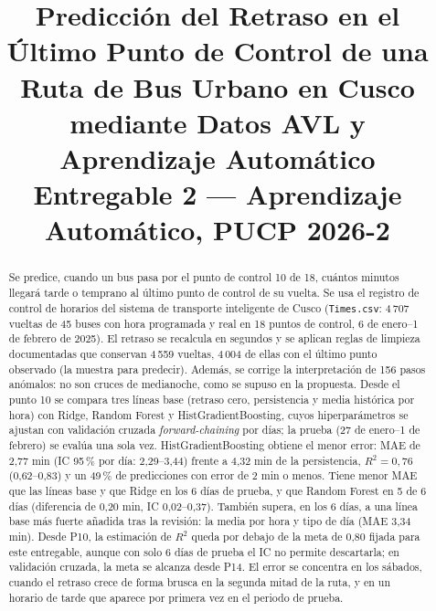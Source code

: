 \documentclass[conference,spanish]{IEEEtran}
\begin{document}
\title{Predicción del Retraso en el Último Punto de Control de una Ruta de Bus Urbano en Cusco mediante Datos AVL y Aprendizaje Automático\\
\large Entregable 2 --- Aprendizaje Automático, PUCP 2026-2}

\author{
}

\maketitle

\begin{abstract}
Se predice, cuando un bus pasa por el punto de control 10 de 18, cuántos minutos llegará tarde o temprano al último punto de control de su vuelta. Se usa el registro de control de horarios del sistema de transporte inteligente de Cusco (\texttt{Times.csv}: 4\,707 vueltas de 45 buses con hora programada y real en 18 puntos de control, 6 de enero--1 de febrero de 2025). El retraso se recalcula en segundos y se aplican reglas de limpieza documentadas que conservan 4\,559 vueltas, 4\,004 de ellas con el último punto observado (la muestra para predecir). Además, se corrige la interpretación de 156 pasos anómalos: no son cruces de medianoche, como se supuso en la propuesta. Desde el punto 10 se compara tres líneas base (retraso cero, persistencia y media histórica por hora) con Ridge, Random Forest y HistGradientBoosting, cuyos hiperparámetros se ajustan con validación cruzada \textit{forward-chaining} por días; la prueba (27 de enero--1 de febrero) se evalúa una sola vez. HistGradientBoosting obtiene el menor error: MAE de 2,77 min (IC 95\,\% por día: 2,29--3,44) frente a 4,32 min de la persistencia, $R^2=0{,}76$ (0,62--0,83) y un 49\,\% de predicciones con error de 2 min o menos. Tiene menor MAE que las líneas base y que Ridge en los 6 días de prueba, y que Random Forest en 5 de 6 días (diferencia de 0,20 min, IC 0,02--0,37). También supera, en los 6 días, a una línea base más fuerte añadida tras la revisión: la media por hora y tipo de día (MAE 3,34 min). Desde P10, la estimación de $R^2$ queda por debajo de la meta de 0,80 fijada para este entregable, aunque con solo 6 días de prueba el IC no permite descartarla; en validación cruzada, la meta se alcanza desde P14. El error se concentra en los sábados, cuando el retraso crece de forma brusca en la segunda mitad de la ruta, y en un horario de tarde que aparece por primera vez en el periodo de prueba.
\end{abstract}
\end{document}
